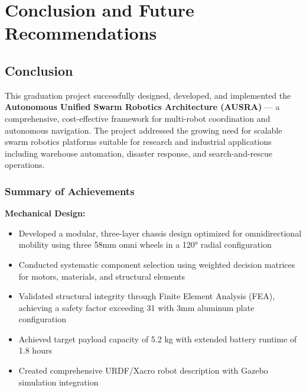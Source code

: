 
\chapter{Conclusion and Future Recommendations}
\label{chap:conclusion}

\section{Conclusion}
\label{sec:conclusion}

This graduation project successfully designed, developed, and implemented the \textbf{Autonomous Unified Swarm Robotics Architecture (AUSRA)} --- a comprehensive, cost-effective framework for multi-robot coordination and autonomous navigation. The project addressed the growing need for scalable swarm robotics platforms suitable for research and industrial applications including warehouse automation, disaster response, and search-and-rescue operations.

\subsection{Summary of Achievements}

\textbf{Mechanical Design:}
\begin{itemize}
    \item Developed a modular, three-layer chassis design optimized for omnidirectional mobility using three 58mm omni wheels in a 120° radial configuration
    \item Conducted systematic component selection using weighted decision matrices for motors, materials, and structural elements
    \item Validated structural integrity through Finite Element Analysis (FEA), achieving a safety factor exceeding 31 with 3mm aluminum plate configuration
    \item Achieved target payload capacity of 5.2 kg with extended battery runtime of 1.8 hours
    \item Created comprehensive URDF/Xacro robot description with Gazebo simulation integration
\end{itemize}

